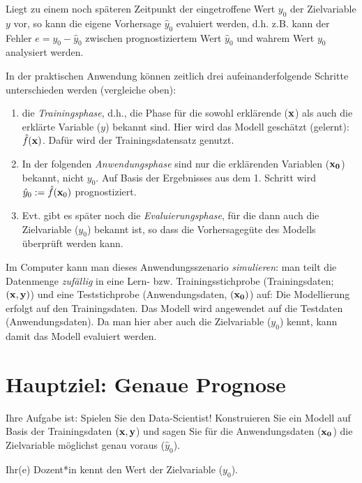 \documentclass[
]{book}
\begin{document}
Liegt zu einem noch späteren Zeitpunkt der eingetroffene Wert \(y_0\) der Zielvariable \(y\) vor, so kann die eigene Vorhersage \(\hat{y}_0\) evaluiert werden,
d.h. z.B. kann der Fehler \(e=y_0-\hat{y}_0\) zwischen prognostiziertem Wert \(\hat{y}_0\) und wahrem Wert \(y_0\) analysiert werden.

In der praktischen Anwendung können zeitlich drei aufeinanderfolgende Schritte unterschieden werden (vergleiche oben):

\begin{enumerate}
\def\labelenumi{\arabic{enumi}.}
\item
  die \emph{Trainingsphase}, d.h., die Phase für die sowohl erklärende (\({\bf{x}}\)) als auch die erklärte Variable (\(y\)) bekannt sind. Hier wird das Modell geschätzt (gelernt): \(\hat{f}(\bf{x})\). Dafür wird der Trainingsdatensatz genutzt.
\item
  In der folgenden \emph{Anwendungsphase} sind nur die erklärenden Variablen (\({\bf{x_0}}\)) bekannt, nicht \(y_0\). Auf Basis der Ergebnisses aus dem 1. Schritt wird \(\hat{y}_0 :=\hat{f}({\bf{x}}_0)\) prognostiziert.
\item
  Evt. gibt es später noch die \emph{Evaluierungsphase}, für die dann auch die Zielvariable (\(y_0\)) bekannt ist, so dass die Vorhersagegüte des Modells überprüft werden kann.
\end{enumerate}

Im Computer kann man dieses Anwendungsszenario \emph{simulieren}:
man teilt die Datenmenge \emph{zufällig} in eine Lern- bzw. Trainingsstichprobe (Trainingsdaten; \((\bf{x},y)\)) und eine Teststichprobe (Anwendungsdaten, \((\bf{x_0})\)) auf:
Die Modellierung erfolgt auf den Trainingsdaten.
Das Modell wird angewendet auf die Testdaten (Anwendungsdaten).
Da man hier aber auch die Zielvariable (\(y_0\)) kennt, kann damit das Modell evaluiert werden.

\hypertarget{hauptziel-genaue-prognose}{%
\section{Hauptziel: Genaue Prognose}\label{hauptziel-genaue-prognose}}

Ihre Aufgabe ist: Spielen Sie den Data-Scientist!
Konstruieren Sie ein Modell auf Basis der Trainingsdaten \((\bf{x},y\))
und sagen Sie für die Anwendungsdaten (\(\bf{x_0}\)) die Zielvariable möglichst genau voraus (\(\hat{y}_0\)).

Ihr(e) Dozent*in kennt den Wert der Zielvariable (\(y_0\)).
\end{document}
